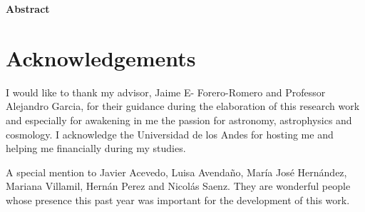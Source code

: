 \begin{titlepage}
\begin{center}
\vspace{10mm}
      \Large\textbf{Abstract}\\
      \vspace{05mm}\small
\end{center}

\newpage





 \section*{Acknowledgements}
 \justify
 I would like to thank my advisor, Jaime E- Forero-Romero and Professor Alejandro Garcia, for their guidance during the elaboration of this research work and especially for awakening in me the passion for astronomy, astrophysics and cosmology. I acknowledge the Universidad de los Andes for hosting me and helping me financially during my studies.
 
 A special mention to Javier Acevedo, Luisa Avendaño, María José Hernández, Mariana Villamil, Hernán Perez and Nicolás Saenz. They are wonderful people whose presence this past year was important for the development of this work.
 

\end{titlepage}
